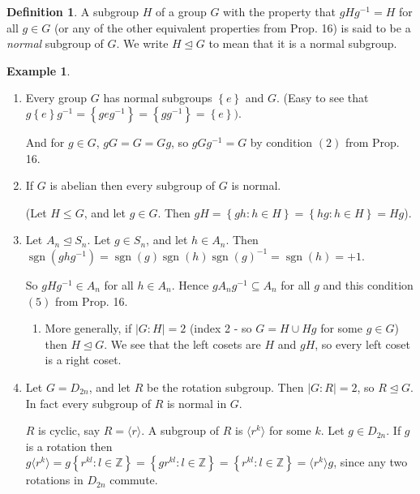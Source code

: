 \documentclass{article}
\theoremstyle{definition}
\newtheorem{definition}{Definition}[section]
\newtheorem*{exmp}{Example}
\newcommand{\gene}[1]{\langle #1 \rangle}
\newcommand{\nsg}[2]{#1 \trianglelefteq #2}
\DeclareMathOperator{\sgn}{sgn}
\begin{document}
\begin{definition}
  A subgroup $H$ of a group $G$ with the property that $gHg^{-1}=H$ for all $g \in G$ (or any of the other equivalent properties from Prop. 16) is said to be a \emph{normal} subgroup of $G$. We write $H \trianglelefteq G$ to mean that it is a normal subgroup.
\end{definition}

\begin{exmp}
  \begin{enumerate}
    \item Every group $G$ has normal subgroups $\left\{ e \right\}$ and $G$. (Easy to see that $g\left\{ e \right\}g^{-1}=\left\{ geg^{-1} \right\}=\left\{ gg^{-1} \right\}=\left\{ e \right\}).$

      And for $g \in G$, $gG = G=Gg$, so $gGg^{-1}=G$ by condition $(2)$ from Prop. 16.

    \item If $G$ is abelian then every subgroup of $G$ is normal. 

      (Let $H \leq G$, and let $g \in G$. Then $gH=\left\{ gh:h \in H \right\}=\left\{ hg:h \in H \right\}=Hg$).

    \item Let $\nsg{A_n}{S_n}$. Let $g \in S_n$, and let $h \in A_n$. Then $\sgn \left( ghg^{-1} \right)=\sgn(g)\sgn(h)\sgn(g)^{-1}=\sgn(h)=+1$.

      So $gHg^{-1} \in A_n$ for all $h \in A_n$. Hence $gA_ng^{-1} \subseteq A_n$ for all $g$ and this condition $(5)$ from Prop. 16.

      \begin{enumerate}
        \item More generally, if $|G:H|=2$ (index 2 -  so $G = H \cup Hg$ for some $g \in G$) then $\nsg{H}{G}$. We see that the left cosets are $H$ and $gH$, so every left coset is a right coset.
      \end{enumerate}

    \item Let $G = D_{2n}$, and let $R$ be the rotation subgroup. Then $|G:R|=2$, so $\nsg{R}{G}$. In fact every subgroup of $R$ is normal in $G$.

      $R$ is cyclic, say $R = \langle r \rangle$.
      A subgroup of $R$ is $\gene{r^k}$ for some $k$. Let $g \in D_{2n}$. If $g$ is a rotation then $g\gene{r^k}=g\left\{ r^{kl}:l \in \mathbb{Z} \right\}=\left\{ gr^{kl}:l \in \mathbb{Z} \right\}= \left\{ r^{kl}:l \in \mathbb{Z} \right\}=\gene{r^k}g$, since any two rotations in $D_{2n}$ commute.


\end{enumerate}
\end{exmp}
\end{document}
